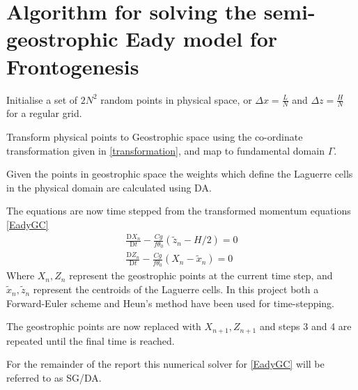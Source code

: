\section{Algorithm for solving the semi-geostrophic Eady model for Frontogenesis \label{Algorithm}}
\begin{description}
	\setlength{\parskip}{0pt}
	\setlength{\itemsep}{0pt}
	\item[Step 1] Initialise a set of $2N^2$ random points in physical space, or $\Delta x = \frac{L}{N}$ and $\Delta z = \frac{H}{N}$ for a regular grid. 
	\item[Step 2] Transform physical points to Geostrophic space using the co-ordinate transformation given in \ref{transformation}, and map to fundamental domain $\Gamma$.
	\item[Step 3] Given the points in geostrophic space the weights which define the Laguerre cells in the physical domain are calculated using DA.
	\item[Step 4] The equations are now time stepped from the transformed momentum equations \ref{EadyGC} 
	\begin{equation*}
		\begin{aligned}
			\frac{\mathrm{D}X_{n}}{\mathrm{D}t} -\frac{Cg}{f\theta _0}\left(\tilde{z}_n-H/2\right) = 0 \\
			\frac{\mathrm{D}Z_{n}}{\mathrm{D}t} - \frac{Cg}{f\theta_0}\left(X_n - \tilde{x}_n\right) = 0
		\end{aligned}
	\end{equation*}
	Where $X_n, Z_n$ represent the geostrophic points at the current time step, and $\tilde{x}_n,\tilde{z}_n$ represent the centroids of the Laguerre cells. In this project both a Forward-Euler scheme and Heun's method have been used for time-stepping.
	\item[Step 5] The geostrophic points are now replaced with $X_{n+1}, Z_{n+1}$ and steps 3 and 4 are repeated until the final time is reached.
\end{description}
For the remainder of the report this numerical solver for \ref{EadyGC} will be referred to as SG/DA.
